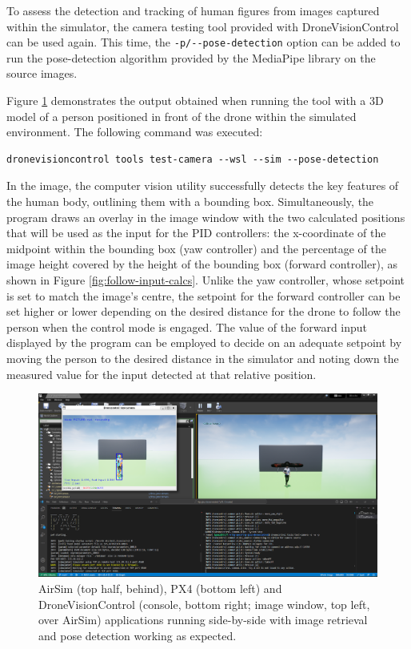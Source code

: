 To assess the detection and tracking of human figures from images captured within the simulator, the camera testing tool provided with DroneVisionControl can be used again. This time, the \texttt{-p/-{}-pose-detection} option can be added to run the pose-detection algorithm provided by the MediaPipe library on the source images.

Figure \ref{fig:airsim-sitl-pose} demonstrates the output obtained when running the tool with a 3D model of a person positioned in front of the drone within the simulated environment. The following command was executed: 
\begin{verbatim}
dronevisioncontrol tools test-camera --wsl --sim --pose-detection
\end{verbatim}


In the image, the computer vision utility successfully detects the key features of the human body, outlining them with a bounding box. Simultaneously, the program draws an overlay in the image window with the two calculated positions that will be used as the input for the PID controllers: the x-coordinate of the midpoint within the bounding box (yaw controller) and the percentage of the image height covered by the height of the bounding box (forward controller), as shown in Figure \ref{fig:follow-input-calcs}. Unlike the yaw controller, whose setpoint is set to match the image's centre, the setpoint for the forward controller can be set higher or lower depending on the desired distance for the drone to follow the person when the control mode is engaged.
The value of the forward input displayed by the program can be employed to decide on an adequate setpoint by moving the person to the desired distance in the simulator and noting down the measured value for the input detected at that relative position.


\begin{figure}[H]
  \centering
  \includegraphics[width=\textwidth, keepaspectratio]{img/airsim-sitl-pose.png}
  \caption{AirSim (top half, behind), PX4 (bottom left) and DroneVisionControl (console, bottom right; image window, top left, over AirSim) applications running side-by-side with image retrieval and pose detection working as expected.}
  \label{fig:airsim-sitl-pose}
\end{figure}


